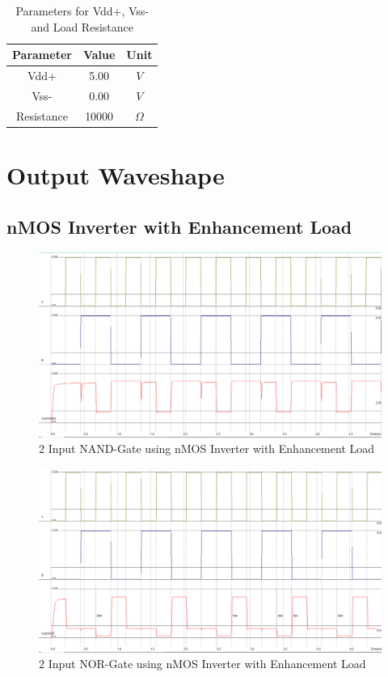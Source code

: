 \documentclass[a4paper,12pt]{article}
\begin{document}
	\begin{table}[H]
		\centering
		\caption{Parameters for Vdd+, Vss- and Load Resistance }
		\begin{tabular}{|c|c|c|}
			\hline
			\textbf{Parameter} & \textbf{Value} & \textbf{Unit} \\ \hline
			Vdd+               & 5.00           & $V $            \\ \hline
			Vss-               & 0.00           & $V$             \\ \hline
			Resistance         & 10000         & $\Omega$             \\ \hline
		\end{tabular}
		
	\end{table}
	
	
	\newpage
	\section{Output Waveshape }
	
	\subsection{nMOS Inverter with Enhancement Load}
\begin{figure}[H]
	\centering
	\includegraphics[width=1\linewidth, height=.41\textheight]{Images5/1.1}
	\caption{2 Input NAND-Gate using nMOS Inverter with Enhancement Load}
	\label{fig:1}
\end{figure}

\begin{figure}[H]
	\centering
	\includegraphics[width=1\linewidth, height=.41\textheight]{Images5/2.1}
	\caption{2 Input NOR-Gate using nMOS Inverter with Enhancement Load}
	\label{fig:1}
\end{figure}
\newpage
\end{document}
